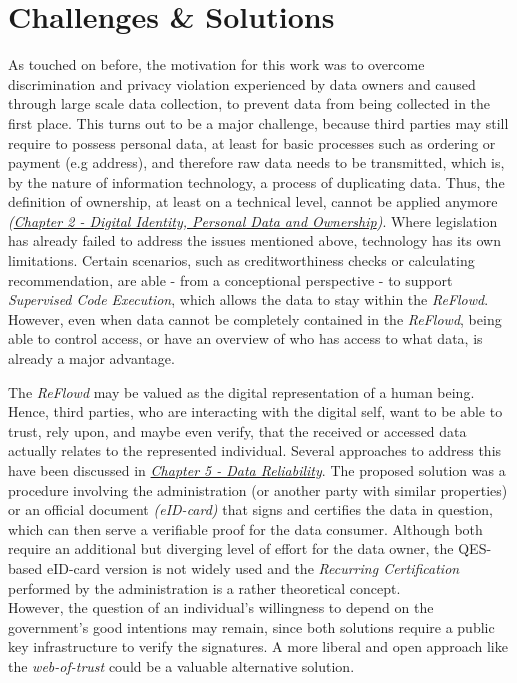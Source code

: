 \documentclass[12pt,english,a4paper,titlepage,cleardoublepage=empty,dottedtoc]{report}
\begin{document}
\section{Challenges \& Solutions}\label{challenges-solutions}

As touched on before, the motivation for this work was to overcome
discrimination and privacy violation experienced by data owners and
caused through large scale data collection, to prevent data from being
collected in the first place. This turns out to be a major challenge,
because third parties may still require to possess personal data, at
least for basic processes such as ordering or payment (e.g address), and
therefore raw data needs to be transmitted, which is, by the nature of
information technology, a process of duplicating data. Thus, the
definition of ownership, at least on a technical level, cannot be
applied anymore \emph{(\protect\hyperlink{def--ownership}{Chapter 2 -
Digital Identity, Personal Data and Ownership})}. Where legislation has
already failed to address the issues mentioned above, technology has its
own limitations. Certain scenarios, such as creditworthiness checks or
calculating recommendation, are able - from a conceptional perspective -
to support \emph{Supervised Code Execution}, which allows the data to
stay within the \emph{ReFlowd}. However, even when data cannot be
completely contained in the \emph{ReFlowd}, being able to control
access, or have an overview of who has access to what data, is already a
major advantage.

The \emph{ReFlowd} may be valued as the digital representation of a
human being. Hence, third parties, who are interacting with the digital
self, want to be able to trust, rely upon, and maybe even verify, that
the received or accessed data actually relates to the represented
individual. Several approaches to address this have been discussed in
\emph{\protect\hyperlink{data-reliability}{Chapter 5 - Data
Reliability}}. The proposed solution was a procedure involving the
administration (or another party with similar properties) or an official
document \emph{(eID-card)} that signs and certifies the data in
question, which can then serve a verifiable proof for the data consumer.
Although both require an additional but diverging level of effort for
the data owner, the QES-based eID-card version is not widely used and
the \emph{Recurring Certification} performed by the administration is a
rather theoretical concept.\\
However, the question of an individual's willingness to depend on the
government's good intentions may remain, since both solutions require a
public key infrastructure to verify the signatures. A more liberal and
open approach like the \emph{web-of-trust} could be a valuable
alternative solution.
\end{document}
